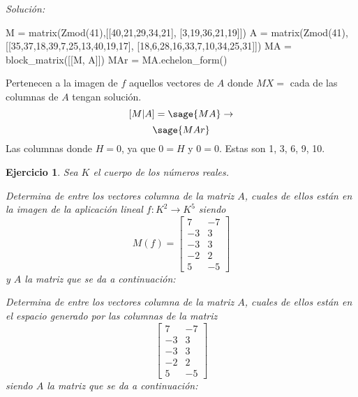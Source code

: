 \documentclass[12pt]{amsart}
\newtheorem{ejer}{Ejercicio}
\begin{document}
{\it Soluci\'on:}

\begin{sageblock}
M = matrix(Zmod(41),[[40,21,29,34,21],
[3,19,36,21,19]])
A = matrix(Zmod(41),[[35,37,18,39,7,25,13,40,19,17],
[18,6,28,16,33,7,10,34,25,31]])
MA = block_matrix([[M, A]])
MAr = MA.echelon_form()
\end{sageblock}

Pertenecen a la imagen de $f$ aquellos vectores de $A$ donde $MX = $ cada de las columnas de $A$ tengan solución.
$$
	[M|A] = \sage{MA} \to
$$
$$
	\sage{MAr}
$$
Las columnas donde $H = 0$, ya que $0 = H$ y $0 = 0$. Estas son 1, 3, 6, 9, 10.



\begin{ejer} Sea $K$ el cuerpo de los n\'umeros reales.
\newline
\noindent\begin{minipage}{\textwidth}
\begin{tcolorbox}[colback = green!20!white,title=Versión Núcleo]
Determina de entre los vectores columna de la matriz $A$, cuales de ellos están en la imagen de la aplicación lineal $f:K^{2} \to K^{5}$ siendo  $$ M(f) = \left[\begin{array}{rr}
7 & -7 \\
-3 & 3 \\
-3 & 3 \\
-2 & 2 \\
5 & -5
\end{array}\right] $$ y $A$ la matriz que se da a continuación:\end{tcolorbox}
\end{minipage} \newline
\noindent\begin{minipage}{\textwidth}
\begin{tcolorbox}[colback = blue!20!white,title=Versión Anulador]
Determina de entre los vectores columna de la matriz $A$, cuales de ellos están en el espacio generado por las columnas de la matriz $$ \left[\begin{array}{rr}
7 & -7 \\
-3 & 3 \\
-3 & 3 \\
-2 & 2 \\
5 & -5
\end{array}\right] $$ siendo $A$ la matriz que se da a continuación:\end{tcolorbox}
\end{minipage} \newline

\end{ejer}
\end{document}
